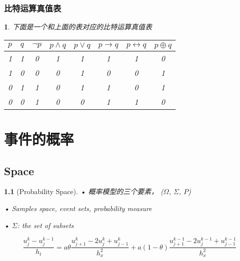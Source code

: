 \documentclass[UTF8]{report}
\theoremstyle{MyLineTheoremStyle} %
\theoremstyle{MyBlockTheoremStyle} %
\theoremstyle{MySubsubsectionStyle} %
\newtheorem{definition}{}
\begin{document}
        \subsection{比特运算真值表}
        \begin{definition}
        下面是一个和上面的表对应的比特运算真值表
        \begin{table}[H]
        \centering
        \begin{tabular}{|c|c|c|c|c|c|c|c|}
        \hline
        $p$ & $q$ & $\neg p$ & $p \land q$ & $p \lor q$ & $p \rightarrow q$ & $p \leftrightarrow q$ & $p \oplus q$  \\
        \hline
        1 & 1 & 0 & 1 & 1 & 1 & 1 & 0  \\
        1 & 0 & 0 & 0 & 1 & 0 & 0 & 1  \\
        0 & 1 & 1 & 0 & 1 & 1 & 0 & 1  \\
        0 & 0 & 1 & 0 & 0 & 1 & 1 & 0  \\
        \hline
        \end{tabular}
        \end{table}
        \end{definition}
        
        



        \chapter{事件的概率}\thispagestyle{fancy} 
        \section{Space}
        
        
        \begin{definition}[Probability Space]
        • 概率模型的三个要素， (\(\Omega\), \(\Sigma\), \(P\))\par
        • Samples space, event sets, probability measure\par
        • \(\Sigma\): the set of subsets
        \end{definition}
        
        




\begin{equation}\label{公式1}
\frac{u_{j}^{k}-u_{j}^{k-1}}{h_t}=a\theta\frac{u_{j+1}^{k}-2u_{j}^{k}+u_{j-1}^{k}}{h_x^2}+a(1-\theta)\frac{u_{j+1}^{k-1}-2u_{j}^{k-1}+u_{j-1}^{k-1}}{h_x^2}
\end{equation}
\end{document}
